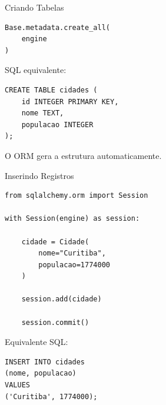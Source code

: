 \documentclass{beamer}
\begin{document}
\begin{frame}[fragile]{Criando Tabelas}

\begin{verbatim}
Base.metadata.create_all(
    engine
)
\end{verbatim}

\vspace{0.3cm}

SQL equivalente:

\begin{verbatim}
CREATE TABLE cidades (
    id INTEGER PRIMARY KEY,
    nome TEXT,
    populacao INTEGER
);
\end{verbatim}

\vspace{0.3cm}

O ORM gera a estrutura automaticamente.

\end{frame}

\begin{frame}[fragile]{Inserindo Registros}

\begin{verbatim}
from sqlalchemy.orm import Session

with Session(engine) as session:

    cidade = Cidade(
        nome="Curitiba",
        populacao=1774000
    )

    session.add(cidade)

    session.commit()
\end{verbatim}

\vspace{0.3cm}

Equivalente SQL:

\begin{verbatim}
INSERT INTO cidades
(nome, populacao)
VALUES
('Curitiba', 1774000);
\end{verbatim}

\end{frame}
\end{document}
